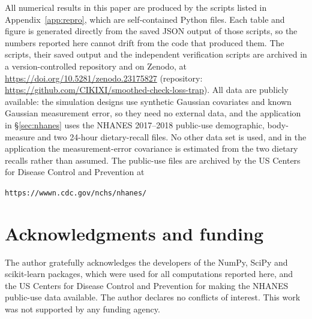 \documentclass[12pt,a4paper]{article}
\theoremstyle{definition}
\theoremstyle{remark}
\begin{document}
All numerical results in this paper are produced by the scripts listed in
Appendix~\ref{app:repro}, which are self-contained Python files. Each table and figure is
generated directly from the saved JSON output of those scripts, so the numbers reported
here cannot drift from the code that produced them. The scripts, their saved output and the
independent verification scripts are archived in a version-controlled repository and on
Zenodo, at \url{https://doi.org/10.5281/zenodo.23175827} (repository:
\url{https://github.com/CIKIXI/smoothed-check-loss-trap}). All data are publicly available: the
simulation designs use synthetic Gaussian covariates and known Gaussian measurement error,
so they need no external data, and the application in \S\ref{sec:nhanes} uses the NHANES
2017--2018 public-use demographic, body-measure and two 24-hour dietary-recall files. No
other data set is used, and in the application the measurement-error covariance is
estimated from the two dietary recalls rather than assumed. The public-use files are
archived by the US Centers for Disease Control and Prevention at
\begin{center}
\texttt{https://wwwn.cdc.gov/nchs/nhanes/}
\end{center}

\section*{Acknowledgments and funding}

The author gratefully acknowledges the developers of the NumPy, SciPy and scikit-learn
packages, which were used for all computations reported here, and the US Centers for
Disease Control and Prevention for making the NHANES public-use data available. The author
declares no conflicts of interest. This work was not supported by any funding agency.

\clearpage


\end{document}
